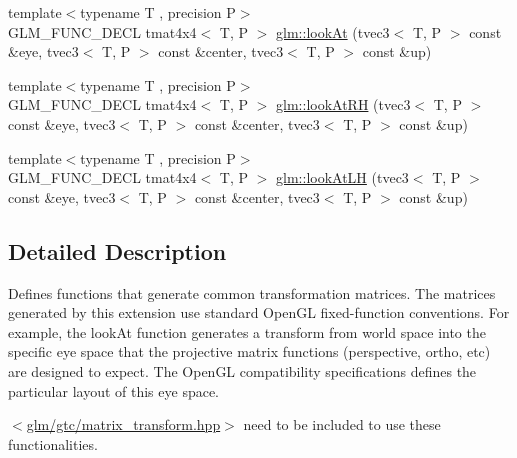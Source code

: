 \begin{DoxyCompactItemize}
\item 
{\footnotesize template$<$typename T , precision P$>$ }\\G\-L\-M\-\_\-\-F\-U\-N\-C\-\_\-\-D\-E\-C\-L tmat4x4$<$ T, P $>$ \hyperlink{group__gtc__matrix__transform_gaf8eef81da1ad09f6a8920101c01eaae4}{glm\-::look\-At} (tvec3$<$ T, P $>$ const \&eye, tvec3$<$ T, P $>$ const \&center, tvec3$<$ T, P $>$ const \&up)
\item 
{\footnotesize template$<$typename T , precision P$>$ }\\G\-L\-M\-\_\-\-F\-U\-N\-C\-\_\-\-D\-E\-C\-L tmat4x4$<$ T, P $>$ \hyperlink{group__gtc__matrix__transform_ga2876d9313334980b94292d2ec169088e}{glm\-::look\-At\-R\-H} (tvec3$<$ T, P $>$ const \&eye, tvec3$<$ T, P $>$ const \&center, tvec3$<$ T, P $>$ const \&up)
\item 
{\footnotesize template$<$typename T , precision P$>$ }\\G\-L\-M\-\_\-\-F\-U\-N\-C\-\_\-\-D\-E\-C\-L tmat4x4$<$ T, P $>$ \hyperlink{group__gtc__matrix__transform_gacd0c077ec7b58a575855e29cb5fb586d}{glm\-::look\-At\-L\-H} (tvec3$<$ T, P $>$ const \&eye, tvec3$<$ T, P $>$ const \&center, tvec3$<$ T, P $>$ const \&up)
\end{DoxyCompactItemize}


\subsection{Detailed Description}
Defines functions that generate common transformation matrices. The matrices generated by this extension use standard Open\-G\-L fixed-\/function conventions. For example, the look\-At function generates a transform from world space into the specific eye space that the projective matrix functions (perspective, ortho, etc) are designed to expect. The Open\-G\-L compatibility specifications defines the particular layout of this eye space.

$<$\hyperlink{matrix__transform_8hpp}{glm/gtc/matrix\-\_\-transform.\-hpp}$>$ need to be included to use these functionalities. 

